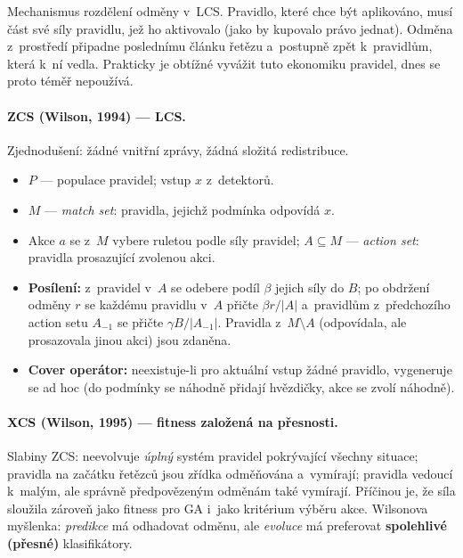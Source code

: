 \documentclass[11pt,a4paper]{article}
\theoremstyle{definition}
\begin{document}
\begin{defbox}
Mechanismus rozdělení odměny v~LCS. Pravidlo, které chce být aplikováno,
musí  část své síly pravidlu, jež ho aktivovalo (jako by kupovalo
právo jednat). Odměna z~prostředí připadne poslednímu článku řetězu a~postupně
 zpět k~pravidlům, která k~ní vedla. Prakticky je obtížné
vyvážit tuto ekonomiku pravidel, dnes se proto téměř nepoužívá.
\end{defbox}

\paragraph{ZCS (Wilson, 1994) ---  LCS.} Zjednodušení:
žádné vnitřní zprávy, žádná složitá redistribuce.
\begin{itemize}
\item $P$ --- populace pravidel; vstup $x$ z~detektorů.
\item $M$ --- \emph{match set}: pravidla, jejichž podmínka odpovídá $x$.
\item Akce $a$ se z~$M$ vybere ruletou podle síly pravidel;
  $A \subseteq M$ --- \emph{action set}: pravidla prosazující zvolenou akci.
\item \textbf{Posílení:} z~pravidel v~$A$ se odebere podíl $\beta$ jejich síly
  do  $B$; po obdržení odměny $r$ se každému pravidlu v~$A$ přičte
  $\beta r/|A|$ a~pravidlům z~předchozího action setu $A_{-1}$ se přičte
  $\gamma B/|A_{-1}|$. Pravidla z~$M \setminus A$ (odpovídala, ale prosazovala
  jinou akci) jsou zdaněna.
\item \textbf{Cover operátor:} neexistuje-li pro aktuální vstup žádné pravidlo,
  vygeneruje se ad hoc (do podmínky se náhodně přidají hvězdičky, akce se zvolí
  náhodně).
\end{itemize}

\paragraph{XCS (Wilson, 1995) --- fitness založená na přesnosti.}
Slabiny ZCS: neevolvuje \emph{úplný} systém pravidel pokrývající všechny
situace; pravidla na začátku řetězců jsou zřídka odměňována a~vymírají;
pravidla vedoucí k~malým, ale správně předpovězeným odměnám také vymírají.
Příčinou je, že síla sloužila zároveň jako fitness pro GA i~jako kritérium
výběru akce. Wilsonova myšlenka: \emph{predikce} má odhadovat odměnu, ale
\emph{evoluce} má preferovat \textbf{spolehlivé (přesné)} klasifikátory.
\end{document}
